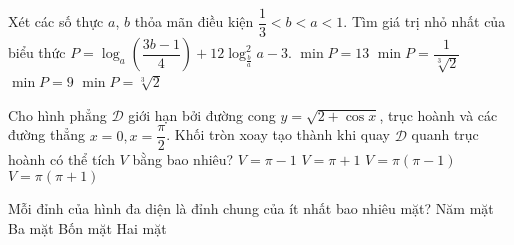 \begin{ex}%
Xét các số thực $a$, $b$ thỏa mãn điều kiện $\dfrac{1}{3}<b<a<1$. Tìm giá trị nhỏ nhất của biểu thức $P=\log_a\left(\dfrac{3b-1}{4}\right)+12\log_{\frac{b}{a}}^2 a-3$.
\choice
{$\min P=13$}
{$\min P=\dfrac{1}{\sqrt[3]{2}}$}
{\True $\min P=9$}
{$\min P=\sqrt[3]{2}$}
\end{ex}

\begin{ex}%
Cho hình phẳng $\mathcal{D}$ giới hạn bởi đường cong $y=\sqrt{2+\cos x}$, trục hoành và các đường thẳng $x=0,x=\dfrac{\pi}{2}$. Khối tròn xoay tạo thành khi quay $\mathcal{D}$ quanh trục hoành có thể tích $V$ bằng bao nhiêu?
\choice
{$V=\pi -1$}
{$V=\pi+1$}
{$V=\pi(\pi-1)$}
{\True $V=\pi(\pi+1)$}
\end{ex}

\begin{ex}%
Mỗi đỉnh của hình đa diện là đỉnh chung của ít nhất bao nhiêu mặt?
\choice
{Năm mặt}
{\True Ba mặt}
{Bốn mặt}
{Hai mặt}
\end{ex}

